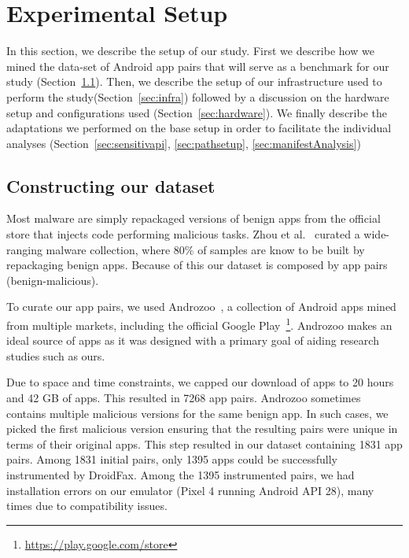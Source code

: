 \section{Experimental Setup}\label{sec:experimentalSetup}

In this section, we describe the setup of our study. First we describe how we mined the data-set of Android app pairs that will serve as a benchmark for our study (Section~\ref{sec:dataset}).  Then, we describe the setup of our infrastructure used to perform the study(Section~\ref{sec:infra}) followed by a discussion on the hardware setup and configurations used (Section~\ref{sec:hardware}). We finally describe the adaptations we performed on the base setup in order to facilitate the individual analyses (Section~\ref{sec:sensitivapi}, \ref{sec:pathsetup}, \ref{sec:manifestAnalysis})

\subsection{Constructing our dataset}\label{sec:dataset} Most malware are simply repackaged versions of benign apps from the official store that injects code performing malicious tasks. Zhou et al.~\cite{DBLP:conf/sp/ZhouJ12} curated a wide-ranging malware collection, where 80\% of samples are know to be built by repackaging benign apps. Because of this our dataset is composed by app pairs (benign-malicious).

To curate our app pairs, we used Androzoo~\cite{DBLP:conf/msr/AllixBKT16}, a collection of Android apps mined from multiple markets, including the official Google Play~\footnote{\url{https://play.google.com/store}}. Androzoo makes an ideal source of apps as it was designed with a primary goal of aiding research studies such as ours. 

Due to space and time constraints, we capped our download of apps to 20 hours and 42 GB of apps. This resulted in 7268 app pairs. Androzoo sometimes contains multiple malicious versions for the same benign app. In such cases, we picked the first malicious version ensuring that the resulting pairs were unique in terms of their original apps. This step resulted in our dataset containing 1831 app pairs. Among 1831 initial pairs, only 1395 apps could be successfully instrumented by DroidFax. Among the 1395 instrumented pairs, we had installation errors on our emulator (Pixel 4 running Android API 28), many times due to compatibility issues. 

